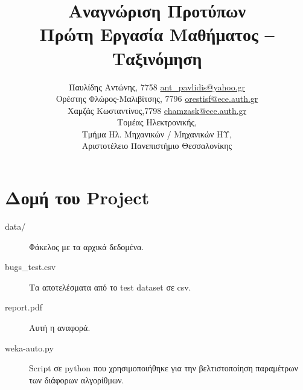 \usepackage{multirow}
\usepackage{placeins}

\usepackage{fontspec}
\setmainfont{DejaVu Serif}
\renewcommand{\contentsname}{Περιεχόμενα}
\renewcommand{\listfigurename}{Λίστα Σχημάτων}
\renewcommand{\figurename}{Σχήμα}
\renewcommand{\lstlistingname}{Καταχώρηση}
\renewcommand{\lstlistlistingname}{List of \lstlistingname s}

\title{Αναγνώριση Προτύπων\\
Πρώτη Εργασία Μαθήματος – Ταξινόμηση}
\author{
  Παυλίδης Αντώνης, 7758  \href{mailto:ant\_pavlidis@yahoo.gr}{ant\_pavlidis@yahoo.gr}\\
  Ορέστης Φλώρος-Μαλιβίτσης, 7796  \href{mailto:orestisf@ece.auth.gr}{orestisf@ece.auth.gr}\\
  Χαμζάς Κωσταντίνος,7798 \href{mailto:chamzask@ece.auth.gr}{chamzask@ece.auth.gr} \\
  Τομέας Ηλεκτρονικής,\\
  Τμήμα Ηλ. Μηχανικών / Μηχανικών ΗΥ,\\
  Αριστοτέλειο Πανεπιστήμιο Θεσσαλονίκης}

\maketitle
\tableofcontents
\listoffigures

\chapter*{Δομή του Project} \label{project-structure}
\begin{description}
\item[data/] Φάκελος με τα αρχικά δεδομένα.
\item[bugs\_test.csv] Τα αποτελέσματα από το test dataset σε csv.
\item[report.pdf] Αυτή η αναφορά.
\item[weka-auto.py] Script σε python που χρησιμοποιήθηκε για την βελτιστοποίηση παραμέτρων των διάφορων αλγορίθμων.
\end{description}






